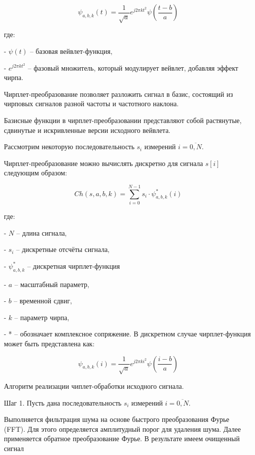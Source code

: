 \begin{multicols}{2}
\begin{equation}
\psi_{a,b,k}(t)=\frac{1}{\sqrt{a}}e^{j2\pi kt^2}\psi \left(\frac{t-b}{a}\right)
\end{equation}

где:

- $\psi(t)$ -- базовая вейвлет-функция,

- $e^{j2\pi kt^2}$ -- фазовый множитель, который модулирует вейвлет,
добавляя эффект чирпа.

Чирплет-преобразование позволяет разложить
сигнал в базис, состоящий из чирповых сигналов разной частоты и
частотного наклона.

Базисные функции в чирплет-преобразовании представляют собой растянутые,
сдвинутые и искривленные версии исходного вейвлета.

Рассмотрим некоторую последовательность $s_i$ измерений $i=\overline{0,N}$.

Чирплет-преобразование можно вычислять дискретно для сигнала
$s[i]$ следующим образом:

\begin{equation}
Ch(s,a,b,k)=\sum^{N-1}_{i=0}s_i\cdot\psi_{a,b,k}^*(i)
\end{equation}

где:


- $N$ -- длина сигнала,

- $s_i$ -- дискретные отсчёты сигнала,

- $\psi_{a,b,k}^*$ -- дискретная чирплет-функция

- $a$ -- масштабный параметр,

- $b$ -- временной сдвиг,

- $k$ -- параметр чирпа,

- * -- обозначает комплексное сопряжение.
В дискретном случае чирплет-функция может быть представлена как:

\begin{equation}
\psi_{a,b,k}(i) = \frac{1}{\sqrt{a}} e^{j2\pi ki^2} \psi\left(\frac{i-b}{a}\right)
\end{equation}

Алгоритм реализации чиплет-обработки исходного сигнала.

Шаг 1. Пусть дана последовательность $s_i$ измерений $i=\overline{0,N}$.

Выполняется фильтрация шума на основе быстрого преобразования Фурье
(FFT). Для этого определяется амплитудный порог для удаления шума. Далее
применяется обратное преобразование Фурье. В результате имеем очищенный
сигнал


\end{multicols}
